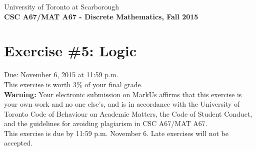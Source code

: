 \documentclass{article}
\begin{document}
{\large \noindent{}University of Toronto at Scarborough\\
\textbf{CSC A67/MAT A67 - Discrete Mathematics, Fall 2015}}

\section*{\huge Exercise \#5: Logic}

{\large Due: November 6, 2015 at 11:59 p.m.\\
This exercise is worth 3\% of your final grade.}\\[1em]
\textbf{Warning:} Your electronic submission on MarkUs affirms that this exercise is your own work and no
one else's, and is in accordance with the University of Toronto Code of Behaviour on Academic Matters,
the Code of Student Conduct, and the guidelines for avoiding plagiarism in CSC A67/MAT A67.\\[1ex]
This exercise is due by 11:59 p.m. November 6. Late exercises will not be accepted.\\[1ex]
\renewcommand{\labelenumi}{\arabic{enumi}.}
\renewcommand{\labelenumii}{(\alph{enumii})}
\end{document}
